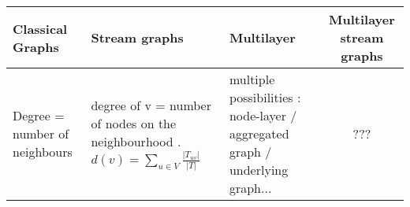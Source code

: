\documentclass[dvipsnames,a4paper,11pt]{article}
\begin{document}
		\begin{tabularx}{\linewidth}{|X||X|X||c|}
		\hline
		\textbf{Classical Graphs} & \textbf{Stream graphs} & \textbf{Multilayer} & \textbf{Multilayer stream graphs}\\
		\hline
		Degree = number of neighbours & degree of v = number of nodes on the neighbourhood . $d(v) = \sum_{u\in V} \frac{|T_{uv}|}{|T|}$ & multiple possibilities : node-layer / aggregated graph / underlying graph... & ??? \\
		\hline
		
	\end{tabularx}
\end{document}

